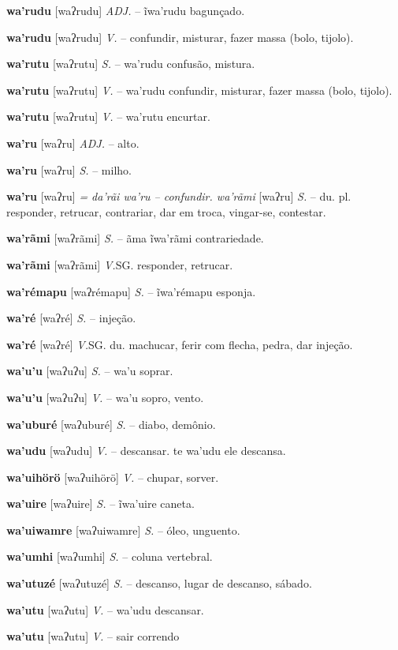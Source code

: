 {{{\textbf{wa'rudu} [waʔrudu] \textit{ADJ.} -- ĩwa'rudu bagunçado.

\textbf{wa'rudu} [waʔrudu] \textit{V.} -- confundir, misturar, fazer massa (bolo, tijolo).

\textbf{wa'rutu} [waʔrutu] \textit{S.} -- wa'rudu confusão, mistura.

\textbf{wa'rutu} [waʔrutu] \textit{V.} -- wa'rudu confundir, misturar, fazer massa (bolo, tijolo).

\textbf{wa'rutu} [waʔrutu] \textit{V.} -- wa'rutu encurtar.

\textbf{wa'ru} [waʔru] \textit{ADJ.} -- alto.

\textbf{wa'ru} [waʔru] \textit{S.} -- milho.

\textbf{wa'ru} [waʔru] \textit{= da'rãi wa'ru -- confundir. wa'rãmi} [waʔru] \textit{S.} -- du. pl. responder, retrucar, contrariar, dar em troca, vingar-se, contestar.

\textbf{wa'rãmi} [waʔrãmi] \textit{S.} -- ãma ĩwa'rãmi contrariedade.

\textbf{wa'rãmi} [waʔrãmi] \textit{V.}SG. responder, retrucar.

\textbf{wa'rémapu} [waʔrémapu] \textit{S.} -- ĩwa'rémapu esponja.

\textbf{wa'ré} [waʔré] \textit{S.} -- injeção.

\textbf{wa'ré} [waʔré] \textit{V.}SG. du. machucar, ferir com flecha, pedra, dar injeção.

\textbf{wa'u'u} [waʔuʔu] \textit{S.} -- wa'u soprar.

\textbf{wa'u'u} [waʔuʔu] \textit{V.} -- wa'u sopro, vento.

\textbf{wa'uburé} [waʔuburé] \textit{S.} -- diabo, demônio.

\textbf{wa'udu} [waʔudu] \textit{V.} -- descansar. te wa'udu ele descansa.

\textbf{wa'uihörö} [waʔuihörö] \textit{V.} -- chupar, sorver.

\textbf{wa'uire} [waʔuire] \textit{S.} -- ĩwa'uire caneta.

\textbf{wa'uiwamre} [waʔuiwamre] \textit{S.} -- óleo, unguento.

\textbf{wa'umhi} [waʔumhi] \textit{S.} -- coluna vertebral.

\textbf{wa'utuzé} [waʔutuzé] \textit{S.} -- descanso, lugar de descanso, sábado.

\textbf{wa'utu} [waʔutu] \textit{V.} -- wa'udu descansar.

\textbf{wa'utu} [waʔutu] \textit{V.} -- {sair correndo}

}}}
